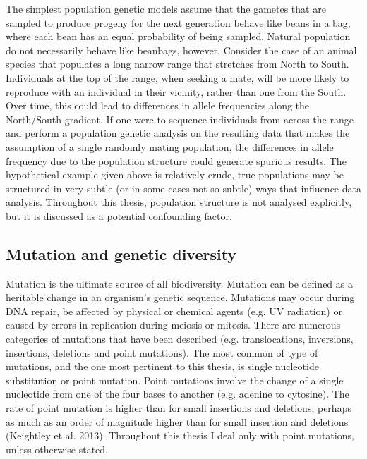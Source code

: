 	The simplest population genetic models assume that the gametes that are sampled to produce progeny for the next generation behave like beans in a bag, where each bean has an equal probability of being sampled. Natural population do not necessarily behave like beanbags, however. Consider the case of an animal species that populates a long narrow range that stretches from North to South. Individuals at the top of the range, when seeking a mate, will be more likely to reproduce with an individual in their vicinity, rather than one from the South. Over time, this could lead to differences in allele frequencies along the North/South gradient. If one were to sequence individuals from across the range and perform a population genetic analysis on the resulting data that makes the assumption of a single randomly mating population, the differences in allele frequency due to the population structure could generate spurious results. The hypothetical example given above is relatively crude, true populations may be structured in very subtle (or in some cases not so subtle) ways that influence data analysis. Throughout this thesis, population structure is not analysed explicitly, but it is discussed as a potential confounding factor.

\subsection{Mutation and genetic diversity}

	Mutation is the ultimate source of all biodiversity. Mutation can be defined as a heritable change in an organism's genetic sequence. Mutations may occur during DNA repair, be affected by physical or chemical agents (e.g. UV radiation) or caused by errors in replication during meiosis or mitosis. There are numerous categories of mutations that have been described (e.g. translocations, inversions, insertions, deletions and point mutations). The most common of type of mutations, and the one most pertinent to this thesis, is single nucleotide substitution or point mutation. Point mutations involve the change of a single nucleotide from one of the four bases to another (e.g. adenine to cytosine). The rate of point mutation is higher than for small insertions and deletions, perhaps as much as an order of magnitude higher than for small insertion and deletions (Keightley et al. 2013). Throughout this thesis I deal only with point mutations, unless otherwise stated.

